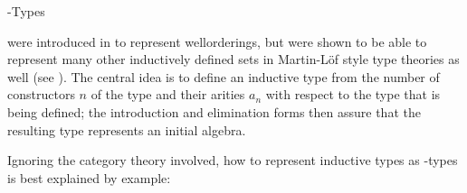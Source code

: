 \hypertarget{wtype}{\wtypesym-Types} were introduced in \cite{Martin-Loef84} to represent wellorderings, but were shown to be able to represent many other inductively defined sets in Martin-Löf style type theories as well (see \cite{Dybjer97}). %
 The central idea is to define an inductive type from the number of constructors $n$ of the type and their arities $a_n$ with respect to the type that is being defined; the introduction and elimination forms then assure that the resulting type represents an initial algebra. 
 
Ignoring the category theory involved, how to represent inductive types as \wtypesym-types is best explained by example:

